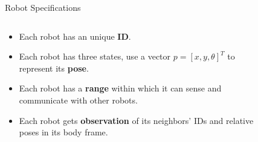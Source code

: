 \documentclass[10pt]{beamer}
\begin{document}

\begin{frame}{Robot Specifications}{}
\begin{block}{}
  \begin{columns}[T] %
      \begin{column}{.5\textwidth}
        \begin{itemize}
        \item Each robot has an unique \textbf{ID}.
        \item Each robot has three states, use a vector $p = [x, y,
          \theta]^T$ to represent its \textbf{pose}.
        \item Each robot has a \textbf{range} within which it can
          sense and communicate with other robots.
        \item Each robot gets \textbf{observation} of its neighbors'
          IDs and relative poses in its body frame.
        \end{itemize}
      \end{column}%
      \begin{column}{.4\textwidth}
        \begin{figure}
          \centering
\end{figure}
\end{column}
\end{columns}
\end{block}
\end{frame}
\end{document}
